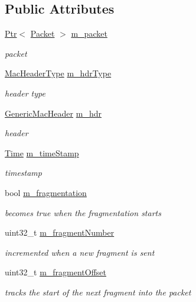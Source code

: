 \subsection*{Public Attributes}
\begin{DoxyCompactItemize}
\item 
\hyperlink{classns3_1_1Ptr}{Ptr}$<$ \hyperlink{classns3_1_1Packet}{Packet} $>$ \hyperlink{structns3_1_1WimaxMacQueue_1_1QueueElement_a3a501efee627709b572bd20e40f30d04}{m\+\_\+packet}
\begin{DoxyCompactList}\small\item\em packet \end{DoxyCompactList}\item 
\hyperlink{classns3_1_1MacHeaderType}{Mac\+Header\+Type} \hyperlink{structns3_1_1WimaxMacQueue_1_1QueueElement_ab1945cfc525a40eb76c27dcbabf062c6}{m\+\_\+hdr\+Type}
\begin{DoxyCompactList}\small\item\em header type \end{DoxyCompactList}\item 
\hyperlink{classns3_1_1GenericMacHeader}{Generic\+Mac\+Header} \hyperlink{structns3_1_1WimaxMacQueue_1_1QueueElement_ae3f92a29bf5f9e569c919e66e2912b5d}{m\+\_\+hdr}
\begin{DoxyCompactList}\small\item\em header \end{DoxyCompactList}\item 
\hyperlink{classns3_1_1Time}{Time} \hyperlink{structns3_1_1WimaxMacQueue_1_1QueueElement_a9bb3a65aa930da2e2972818880d03954}{m\+\_\+time\+Stamp}
\begin{DoxyCompactList}\small\item\em timestamp \end{DoxyCompactList}\item 
bool \hyperlink{structns3_1_1WimaxMacQueue_1_1QueueElement_a6d56af1a2eea571ec5921ab0700f0a90}{m\+\_\+fragmentation}
\begin{DoxyCompactList}\small\item\em becomes true when the fragmentation starts \end{DoxyCompactList}\item 
uint32\+\_\+t \hyperlink{structns3_1_1WimaxMacQueue_1_1QueueElement_a20ee38a0ba1c8b312b6c9bb5ae3462d4}{m\+\_\+fragment\+Number}
\begin{DoxyCompactList}\small\item\em incremented when a new fragment is sent \end{DoxyCompactList}\item 
uint32\+\_\+t \hyperlink{structns3_1_1WimaxMacQueue_1_1QueueElement_a6c4535c4f63634ede1e359ea1d3a9ab6}{m\+\_\+fragment\+Offset}
\begin{DoxyCompactList}\small\item\em tracks the start of the next fragment into the packet \end{DoxyCompactList}\end{DoxyCompactItemize}


